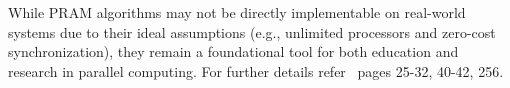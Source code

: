\documentclass[12pt]{book}
\begin{document}
While PRAM algorithms may not be directly implementable on real-world systems due to their ideal assumptions (e.g., unlimited processors and zero-cost synchronization), they remain a foundational tool for both education and research in parallel computing. For further details refer~\cite{quinn1994parallel} pages 25-32, 40-42, 256.



\end{document}
